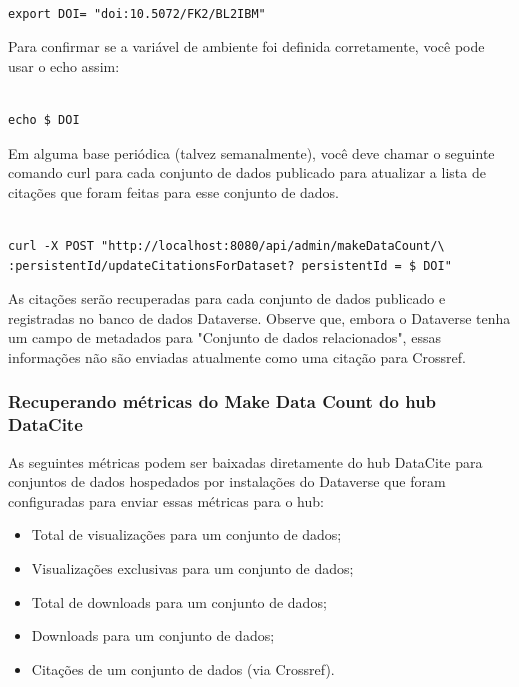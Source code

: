 \documentclass[12pt,hidelinks]{article}
\begin{document}
\begin{verbatim}

export DOI= "doi:10.5072/FK2/BL2IBM"

\end{verbatim}

Para confirmar se a variável de ambiente foi definida corretamente, você pode usar o echo assim:

\begin{verbatim}

echo $ DOI

\end{verbatim}

Em alguma base periódica (talvez semanalmente), você deve chamar o seguinte comando curl para cada conjunto de dados publicado para atualizar a lista de citações que foram feitas para esse conjunto de dados.

\begin{verbatim}

curl -X POST "http://localhost:8080/api/admin/makeDataCount/\
:persistentId/updateCitationsForDataset? persistentId = $ DOI"

\end{verbatim}

As citações serão recuperadas para cada conjunto de dados publicado e registradas no banco de dados Dataverse. Observe que, embora o Dataverse tenha um campo de metadados para "Conjunto de dados relacionados", essas informações não são enviadas atualmente como uma citação para Crossref.

\subsubsection{Recuperando métricas do Make Data Count do hub DataCite}

\qquad As seguintes métricas podem ser baixadas diretamente do hub DataCite para conjuntos de dados hospedados por instalações do Dataverse que foram configuradas para enviar essas métricas para o hub:

\begin{itemize}

    \item Total de visualizações para um conjunto de dados;
    \item Visualizações exclusivas para um conjunto de dados;
    \item Total de downloads para um conjunto de dados;
    \item Downloads para um conjunto de dados;
    \item Citações de um conjunto de dados (via Crossref).

\end{itemize}
\end{document}
